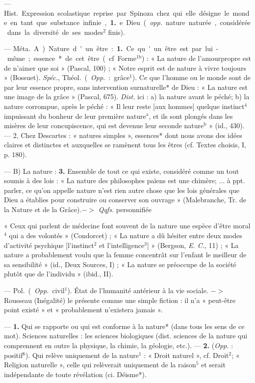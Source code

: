 \begin{itemize}[leftmargin=1cm, label=, itemsep=1pt]
 — \si{Hist.} Expression scolastique reprise par Spinoza
chez qui elle désigne le monde en
tant que substance infinie, {\bf 1.} e. Dieu
({\it opp.} nature naturée, considérée dans
la diversité de ses modes$^2$ finis).

 — \si{Méta.} A) Nature d'un
être : {\bf 1.} Ce qu'un être est par lui-même ; essence* de cet être (cf.
Forme$^\text{1b}$) : « La nature de l’amourpropre est de n’aimer que soi »
(Pascal, 100) ; « Notre esprit est de
nature à vivre toujours » (Bossuet).
{\it Spéc.}, \si{Théol.} ({\it Opp.} : grâce$^1$). Ce que
l’homme ou le monde sont de par
leur essence propre, sans intervention surnaturelle* de Dieu : « La
nature est une image de la grâce »
(Pascal, 675). {\it Dist.} ici : a) la nature
avant le péché; b) la nature corrompue, après le péché : « Il leur
reste [aux hommes] quelque instinct$^4$ impuissant du bonheur de
leur première nature$^\text{a}$, et ils sont
plongés dans les misères de leur
concupiscence, qui est devenue leur
seconde nature$^\text{b}$ » (id., 430). — 2,
Chez Descartes : « natures simples »,
essences* dont nous avons des idées
claires et distinctes et auxquelles
se ramènent tous les êtres (cf.
Textes choisis, I, p. 180).

— B) La nature : {\bf 3.} Ensemble de
tout ce qui existe, considéré comme
un tout soumis à des lois : « La
nature des philosophes païens est
une chimère; ... à ppt. parler, ce
qu’on appelle nature n’est rien
autre chose que les lois générales
que Dieu a établies pour construire
ou conserver son ouvrage » (Malebranche, Tr. de la Nature et de la
Grâce).$->$ {\it Qqfs.} personnifiée

« Ceux qui parlent de médecine
font souvent de la nature une espèce
d'être moral$^4$ qui a des volontés »
(Condorcet) ; « La nature a dû hésiter
entre deux modes d'activité psychique [l’instinct$^2$ et l'intelligence$^3$] »
(Bergson, {\it E. C.}, 11) ; « La nature
a probablement voulu que la femme
concentrât sur l'enfant le meilleur
de sa sensibilité » (id., Deux Sources,
I) ; « La nature se préoccupe de la
société plutôt que de l'individu »
(ibid., II).

 — \si{Pol.} ({\it Opp.}
civil$^1$). État de l'humanité antérieur
à la vie sociale. $->$ Rousseau (Inégalité) le présente comme une simple
fiction : il n'a « peut-être point
existé » et « probablement n’existera
jamais ».

 — {\bf 1.} Qui se rapporte ou qui
est conforme à la nature* (dans
tous les sens de ce mot). Sciences
naturelles : les sciences biologiques
(dist. sciences de la nature qui comprennent en outre la physique, la
chimie, la géologie, etc.). — {\bf 2.} ({\it Opp.} :
positif$^6$). Qui relève uniquement de
la nature$^1$ : « Droit naturel », cf.
Droit$^2$; « Religion naturelle », celle
qui relèverait uniquement de la
raison$^5$ et serait indépendante de
toute révélation (ci. Déisme*).


\end{itemize}
